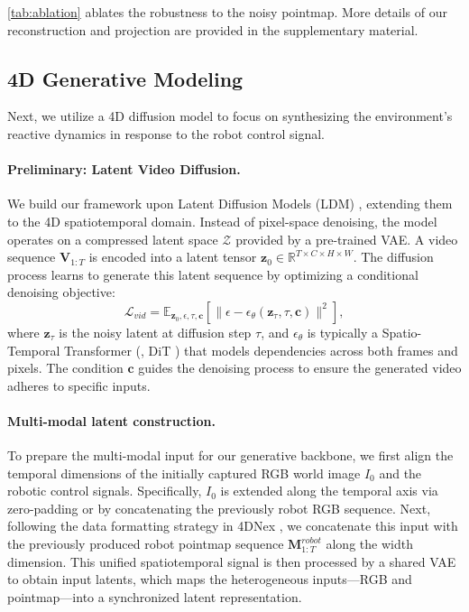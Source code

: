 \cref{tab:ablation} ablates the robustness to the noisy pointmap. More details of our reconstruction and projection are provided in the supplementary material.

\subsection{4D Generative Modeling}
\label{sec:4d_gen_modeling}
Next, we utilize a 4D diffusion model to focus on synthesizing the environment’s reactive dynamics in response to the robot control signal.

\paragraph{Preliminary: Latent Video Diffusion.}
We build our framework upon Latent Diffusion Models (LDM) \cite{rombach2022high}, extending them to the 4D spatiotemporal domain. Instead of pixel-space denoising, the model operates on a compressed latent space $\mathcal{Z}$ provided by a pre-trained VAE. A video sequence $\mathbf{V}_{1:T}$ is encoded into a latent tensor $\mathbf{z}_0 \in \mathbb{R}^{T \times C \times H \times W}$. The diffusion process learns to generate this latent sequence by optimizing a conditional denoising objective:
{\scriptsize
\begin{equation}
    \mathcal{L}_{vid} = \mathbb{E}_{\mathbf{z}_0, \epsilon, \tau, \mathbf{c}} \left[ \| \epsilon - \epsilon_\theta(\mathbf{z}_\tau, \tau, \mathbf{c}) \|^2 \right],
\end{equation}
}
where $\mathbf{z}_\tau$ is the noisy latent at diffusion step $\tau$, and $\epsilon_\theta$ is typically a Spatio-Temporal Transformer (\eg, DiT \cite{dit}) that models dependencies across both frames and pixels. The condition $\mathbf{c}$ guides the denoising process to ensure the generated video adheres to specific inputs.

\paragraph{Multi-modal latent construction.}
To prepare the multi-modal input for our generative backbone, we first align the temporal dimensions of the initially captured RGB world image $I_0$ and the robotic control signals. Specifically, $I_0$ is extended along the temporal axis via zero-padding or by concatenating the previously robot RGB sequence.
Next, following the data formatting strategy in 4DNex \cite{chen20254dnex}, we concatenate this input with the previously produced robot pointmap sequence $\mathbf{M}_{1:T}^{robot}$ along the width dimension. This unified spatiotemporal signal is then processed by a shared VAE to obtain input latents, which maps the heterogeneous inputs—RGB and pointmap—into a synchronized latent representation.

